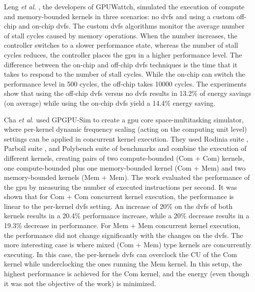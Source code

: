 Leng \textit{et al.} \cite{leng_gpuwattch:_2013}, the developers of GPUWattch, simulated the execution of compute and memory-bounded kernels in three scenarios: no \acrshort{dvfs} and using a custom off-chip and on-chip \acrshort{dvfs}. The custom \acrshort{dvfs} algorithms monitor the average number of stall cycles caused by memory operations. When the number increases, the controller switches to a slower performance state, whereas the number of stall cycles reduces, the controller places the \acrshort{gpu} in a higher performance level. The difference between the on-chip and off-chip \acrshort{dvfs} techniques is the time that it takes to respond to the number of stall cycles. While the on-chip can switch the performance level in 500 cycles, the off-chip takes 10000 cycles. The experiments show that using the off-chip \acrshort{dvfs} versus no \acrshort{dvfs} results in 13.2\% of energy savings (on average) while using the on-chip \acrshort{dvfs} yield a 14.4\% energy saving.

Cha \textit{et al.} \cite{cha_core-level_2018} used GPGPU-Sim to create a \acrshort{gpu} core space-multitasking simulator, where per-kernel dynamic frequency scaling (acting on the computing unit level) settings can be applied in concurrent kernel execution. They used Rodinia suite \cite{che_rodinia:_2009}, Parboil suite \cite{stratton_parboil:_nodate}, and Polybench suite \cite{noauthor_polybench/c_nodate} of benchmarks and combine the execution of different kernels, creating pairs of two compute-bounded (Com + Com) kernels, one compute-bounded plus one memory-bounded kernel (Com + Mem) and two memory-bounded kernels (Mem + Mem). The work evaluated the performance of the \acrshort{gpu} by measuring the number of executed instructions per second. It was shown that for Com + Com concurrent kernel execution, the performance is linear to the per-kernel \acrshort{dvfs} setting. An increase of 20\% on the \acrshort{dvfs} of both kernels results in a 20.4\% performance increase, while a 20\% decrease results in a 19.3\% decrease in performance. For Mem + Mem concurrent kernel execution, the performance did not change significantly with the changes on the \acrshort{dvfs}. The more interesting case is where mixed (Com + Mem) type kernels are concurrently executing. In this case, the per-kernels \acrshort{dvfs} can overclock the CU of the Com kernel while underclocking the ones running the Mem kernel. In this setup, the highest performance is achieved for the Com kernel, and the energy (even though it was not the objective of the work) is minimized.


